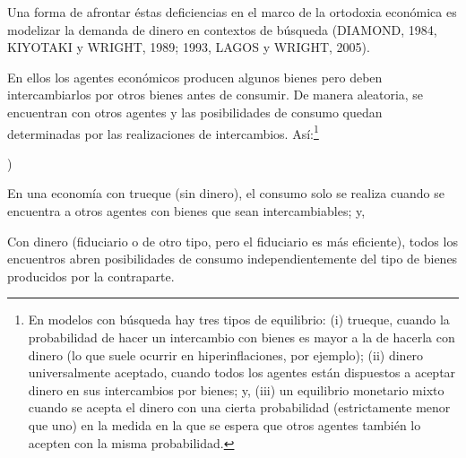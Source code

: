 \documentclass[10pt,a4paper]{article}
\newcounter{alphaitem}
\newenvironment{la}
      {\begin{list}{\alph{alphaitem})}{%
          \usecounter{alphaitem}%
          \setlength{\leftmargin}{1cm}%
          \setlength{\parskip}{3pt}%
          \setlength{\itemsep}{0pt}%
          \setlength{\parsep}{0pt}%
      }}
      {\end{list}}
\begin{document}
Una forma de afrontar éstas deficiencias en el marco de la ortodoxia económica es modelizar la demanda de dinero en contextos de búsqueda (DIAMOND, 1984, KIYOTAKI y WRIGHT, 1989; 1993, LAGOS y WRIGHT, 2005). 

En ellos los agentes económicos producen algunos bienes pero deben intercambiarlos por otros bienes antes de consumir. De manera aleatoria, se encuentran con otros agentes y las posibilidades de consumo quedan determinadas por las realizaciones de intercambios. Así:\footnote{
En modelos con búsqueda hay tres tipos de equilibrio: (i) trueque, cuando la probabilidad de hacer un intercambio con bienes es mayor a la de hacerla con dinero (lo que suele ocurrir en hiperinflaciones, por ejemplo); (ii) dinero universalmente aceptado, cuando todos los agentes están dispuestos a aceptar dinero en sus intercambios por bienes; y, (iii) un equilibrio monetario mixto cuando se acepta el dinero con una cierta probabilidad (estrictamente menor que uno) en la medida en la que se espera que otros agentes también lo acepten con la misma probabilidad.
}
\begin{la}
    \item En una economía con trueque (sin dinero), el consumo solo se realiza cuando se encuentra a otros agentes con bienes que sean intercambiables; y,
    \item Con dinero (fiduciario o de otro tipo, pero el fiduciario es más eficiente), todos los encuentros abren posibilidades de consumo independientemente del tipo de bienes producidos por la contraparte.
\end{la}
\end{document}
